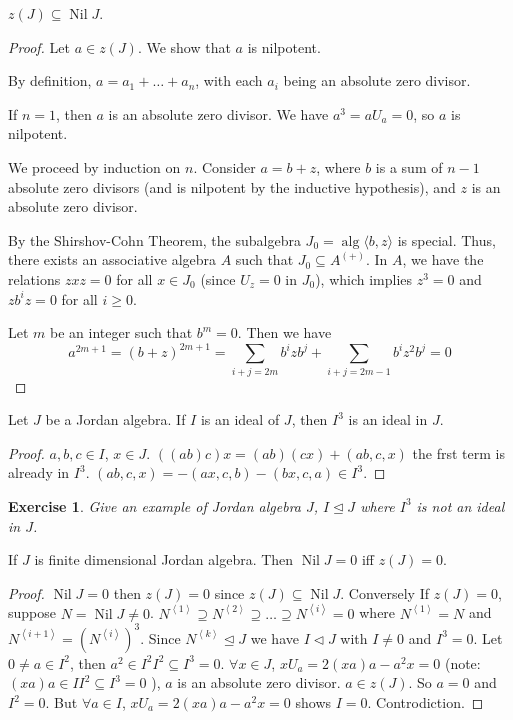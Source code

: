 \documentclass{article}
\newtheorem{exercise}[theorem]{Exercise}
\def\<{\mathop{\langle}}
\def\>{\mathop{\rangle}}
\begin{document}
\begin{lemma}  
$z(J) \subseteq \operatorname{Nil} J$.  
\end{lemma}  

\begin{proof} 
Let $a \in z(J)$. We show that $a$ is nilpotent. 

By definition, $a = a_1 + \dots + a_n$, with each $a_i$ being an absolute zero divisor.  

If $n=1$, then $a$ is an absolute zero divisor. We have $a^3 = a U_a = 0$, so $a$ is nilpotent.  

We proceed by induction on $n$. Consider $a = b+z$, where $b$ is a sum of $n-1$ absolute zero divisors (and is nilpotent by the inductive hypothesis), and $z$ is an absolute zero divisor.  

By the Shirshov-Cohn Theorem, the subalgebra $J_0 = \operatorname{alg}\langle b, z \rangle$ is special. Thus, there exists an associative algebra $A$ such that $J_0 \subseteq A^{(+)}$. In $A$, we have the relations $zxz = 0$ for all $x \in J_0$ (since $U_z=0$ in $J_0$), which implies $z^3= 0$ and $zb^iz=0$ for all $i \ge 0$.  

Let $m$ be an integer such that $b^m=0$. Then we have  
\[ a^{2m+1}=(b+z)^{2m+1} = \sum_{i+j=2m} b^i z b^j + \sum_{i+j=2m-1}b^i z^2 b^j=0 \]  
\end{proof}

\begin{lemma}  
Let $J$ be a Jordan algebra. If $I$ is an ideal of $J$, then $I^3$ is an ideal in $J$.  
\end{lemma} 

\begin{proof} 
$ a,b,c \in I $, $ x \in J $. $ ((ab)c)x=(ab)(cx)+(ab,c,x) $ the frst term is already in $ I^3 $. $ (ab,c,x)=-(ax,c,b)-(bx,c,a) \in I^3$.     
\end{proof}

\begin{exercise}
Give an example of Jordan algebra $ J $, $ I \trianglelefteq J $ where $ I^3 $ is not an ideal in $ J $.    
\end{exercise}

\begin{theorem} 
If $ J $ is finite dimensional Jordan algebra. Then $ \operatorname{Nil}J=0 $ iff $ z(J)=0 $.   
\end{theorem}

\begin{proof}
$ \operatorname{Nil}J=0 $ then $ z(J)=0 $ since $ z(J) \subseteq \operatorname{Nil}J $. Conversely If $ z(J)=0 $, suppose $ N=\operatorname{Nil}J \neq 0$. $ N^{\< 1\>} \supseteq N^{\< 2\>} \supseteq \ldots \supseteq N^{\< i\>}=0$ where $ N^{\< 1\>}=N $ and $ N^{\< i+1\>}=(N^{\< i\>})^3 $. Since $ N^{\< k \>}  \trianglelefteq J$ we have $ I \triangleleft J $ with $ I \neq 0 $ and $ I^3=0 $. Let $ 0 \neq a \in I^2 $, then $ a^2 \in I^2 I^2 \subseteq I^3 =0 $. $ \forall x \in J $, $ xU_a=2(xa)a-a^2x=0 $ (note: $ (xa)a \in I I^2\subseteq I^3=0 $ ), $ a $ is an absolute zero divisor. $ a \in z(J) $. So $ a=0 $ and $ I^2=0 $. But $ \forall a \in I $, $ xU_a =2(xa)a-a^2x  =0 $ shows $ I=0 $. Controdiction.    
\end{proof}
\end{document}
